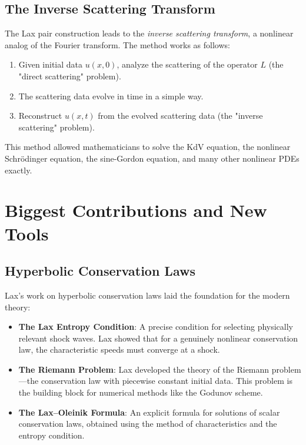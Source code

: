 \subsection{The Inverse Scattering Transform}

The Lax pair construction leads to the \emph{inverse scattering transform}, a nonlinear analog of the Fourier transform. The method works as follows:

\begin{enumerate}
\item Given initial data $u(x, 0)$, analyze the scattering of the operator $L$ (the "direct scattering" problem).
\item The scattering data evolve in time in a simple way.
\item Reconstruct $u(x, t)$ from the evolved scattering data (the "inverse scattering" problem).
\end{enumerate}

This method allowed mathematicians to solve the KdV equation, the nonlinear Schr\"odinger equation, the sine-Gordon equation, and many other nonlinear PDEs exactly.

\section{Biggest Contributions and New Tools}

\subsection{Hyperbolic Conservation Laws}

Lax's work on hyperbolic conservation laws laid the foundation for the modern theory:

\begin{itemize}
\item \textbf{The Lax Entropy Condition}: A precise condition for selecting physically relevant shock waves. Lax showed that for a genuinely nonlinear conservation law, the characteristic speeds must converge at a shock.

\item \textbf{The Riemann Problem}: Lax developed the theory of the Riemann problem---the conservation law with piecewise constant initial data. This problem is the building block for numerical methods like the Godunov scheme.

\item \textbf{The Lax--Oleinik Formula}: An explicit formula for solutions of scalar conservation laws, obtained using the method of characteristics and the entropy condition.
\end{itemize}

